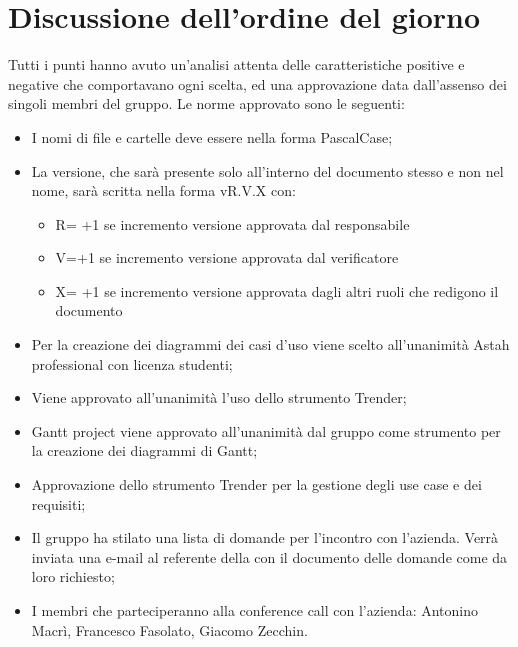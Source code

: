 \documentclass[../verbale-2016-12-14.tex]{subfiles}
\begin{document}
	\section{Discussione dell'ordine del giorno}
	Tutti i punti hanno avuto un'analisi attenta delle caratteristiche positive e negative che comportavano ogni scelta, ed una approvazione data dall’assenso dei singoli membri del gruppo. Le norme approvato sono le seguenti:
			\begin{itemize}
				\item I nomi di file e cartelle deve essere nella forma PascalCase;
				\item La versione, che sarà presente solo all'interno del documento stesso e non nel nome, sarà scritta nella forma vR.V.X con:
					\begin{itemize}
						\item R= +1 se incremento versione approvata dal responsabile
						\item V=+1 se incremento versione  approvata dal verificatore
						\item X= +1 se incremento versione  approvata dagli altri ruoli che redigono il documento
					\end{itemize}
		\item Per la creazione dei diagrammi dei casi d’uso viene scelto all’unanimità Astah professional con licenza studenti;
		\item Viene approvato all’unanimità l’uso dello strumento Trender;
		\item Gantt project viene approvato all’unanimità dal gruppo come strumento per la creazione dei diagrammi di Gantt;
		\item Approvazione dello strumento Trender per la gestione degli use case e dei requisiti;
		\item Il gruppo ha stilato una lista di domande per l’incontro con l’azienda. Verrà inviata una e-mail al referente della \prop con il documento delle domande come da loro richiesto;
		\item I membri che parteciperanno alla conference call con l’azienda: Antonino Macrì, Francesco Fasolato, Giacomo Zecchin.
	\end{itemize}
\end{document}
